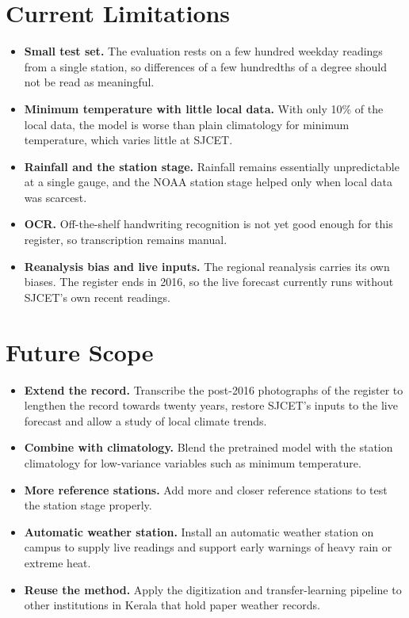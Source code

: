 \section{Current Limitations}
\label{sec:con-limitations}

\begin{itemize}[itemsep=0pt,topsep=4pt]
    \item \textbf{Small test set.} The evaluation rests on a few hundred weekday readings from a single station, so differences of a few hundredths of a degree should not be read as meaningful.
    \item \textbf{Minimum temperature with little local data.} With only 10\% of the local data, the model is worse than plain climatology for minimum temperature, which varies little at SJCET.
    \item \textbf{Rainfall and the station stage.} Rainfall remains essentially unpredictable at a single gauge, and the NOAA station stage helped only when local data was scarcest.
    \item \textbf{OCR.} Off-the-shelf handwriting recognition is not yet good enough for this register, so transcription remains manual.
    \item \textbf{Reanalysis bias and live inputs.} The regional reanalysis carries its own biases. The register ends in 2016, so the live forecast currently runs without SJCET's own recent readings.
\end{itemize}

\section{Future Scope}
\label{sec:con-future}

\begin{itemize}[itemsep=0pt,topsep=4pt]
    \item \textbf{Extend the record.} Transcribe the post-2016 photographs of the register to lengthen the record towards twenty years, restore SJCET's inputs to the live forecast and allow a study of local climate trends.
    \item \textbf{Combine with climatology.} Blend the pretrained model with the station climatology for low-variance variables such as minimum temperature.
    \item \textbf{More reference stations.} Add more and closer reference stations to test the station stage properly.
    \item \textbf{Automatic weather station.} Install an automatic weather station on campus to supply live readings and support early warnings of heavy rain or extreme heat.
    \item \textbf{Reuse the method.} Apply the digitization and transfer-learning pipeline to other institutions in Kerala that hold paper weather records.
\end{itemize}
